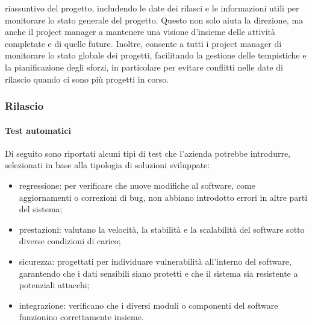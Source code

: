 \begin{itemize}
\begin{itemize}
                    riassuntivo del progetto, includendo le date dei rilasci e le informazioni utili per monitorare lo stato
                    generale del progetto. Questo non solo aiuta la direzione, ma anche il project manager a mantenere una visione
                    d'insieme delle attività completate e di quelle future. Inoltre, consente a tutti i project manager di monitorare
                    lo stato globale dei progetti, facilitando la gestione delle tempistiche e la pianificazione degli sforzi, in
                    particolare per evitare conflitti nelle date di rilascio quando ci sono più progetti in corso.
                \end{itemize}
            \end{itemize}
        
        \subsubsection{Rilascio}
            \paragraph{Test automatici}
            Di seguito sono riportati alcuni tipi di test che l'azienda potrebbe introdurre, selezionati in base alla tipologia di soluzioni sviluppate:
            \begin{itemize}
                \item regressione: per verificare che nuove modifiche al software, come aggiornamenti o correzioni di bug, non abbiano
                introdotto errori in altre parti del sistema;
                \item prestazioni: valutano la velocità, la stabilità e la scalabilità del software sotto diverse condizioni di carico;
                \item sicurezza: progettati per individuare vulnerabilità all’interno del software, garantendo che i dati sensibili siano
                protetti e che il sistema sia resistente a potenziali attacchi;
                \item integrazione: verificano che i diversi moduli o componenti del software funzionino correttamente insieme.
            \end{itemize}
            
